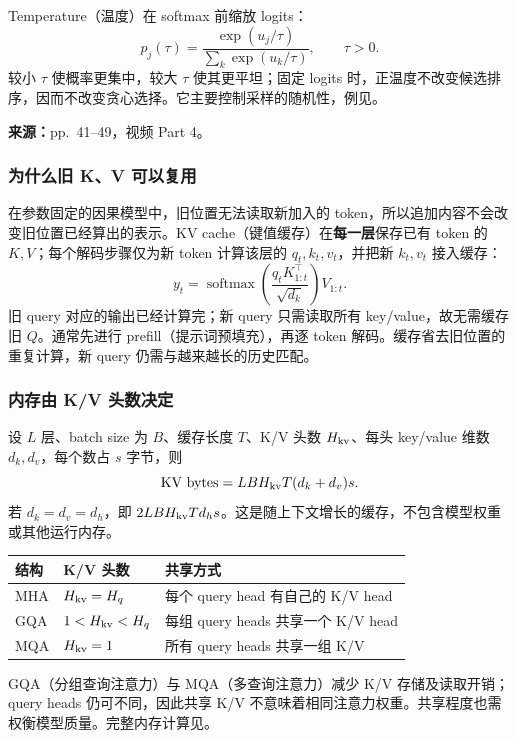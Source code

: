 Temperature（温度）在 softmax 前缩放 logits：
\[
 p_j(\tau)=\frac{\exp(u_j/\tau)}{\sum_k\exp(u_k/\tau)},\qquad \tau>0.
\]
较小 $\tau$ 使概率更集中，较大 $\tau$ 使其更平坦；固定 logits 时，正温度不改变候选排序，因而不改变贪心选择。它主要控制采样的随机性，例见。


\textbf{来源：}pp.~41--49，视频 Part 4。

\subsubsection{为什么旧 K、V 可以复用}

在参数固定的因果模型中，旧位置无法读取新加入的 token，所以追加内容不会改变旧位置已经算出的表示。KV cache（键值缓存）在\textbf{每一层}保存已有 token 的 $K,V$；每个解码步骤仅为新 token 计算该层的 $q_t,k_t,v_t$，并把新 $k_t,v_t$ 接入缓存：
\[
 y_t=\operatorname{softmax}\!\left(\frac{q_tK_{1:t}^\top}{\sqrt{d_k}}\right)V_{1:t}.
\]
旧 query 对应的输出已经计算完；新 query 只需读取所有 key/value，故无需缓存旧 $Q$。通常先进行 prefill（提示词预填充），再逐 token 解码。缓存省去旧位置的重复计算，新 query 仍需与越来越长的历史匹配。

\subsubsection{内存由 K/V 头数决定}

设 $L$ 层、batch size 为 $B$、缓存长度 $T$、K/V 头数 $H_{\rm kv}$、每头 key/value 维数 $d_k,d_v$，每个数占 $s$ 字节，则
\[
 \text{KV bytes}=LBH_{\rm kv}T(d_k+d_v)s.
\]
若 $d_k=d_v=d_h$，即 $2LBH_{\rm kv}Td_hs$。这是随上下文增长的缓存，不包含模型权重或其他运行内存。

\begin{center}
\small
\begin{tabularx}{\textwidth}{@{}llX@{}}
\toprule
结构 & K/V 头数 & 共享方式 \\
\midrule
MHA & $H_{\rm kv}=H_q$ & 每个 query head 有自己的 K/V head \\
GQA & $1<H_{\rm kv}<H_q$ & 每组 query heads 共享一个 K/V head \\
MQA & $H_{\rm kv}=1$ & 所有 query heads 共享一组 K/V \\
\bottomrule
\end{tabularx}
\end{center}
GQA（分组查询注意力）与 MQA（多查询注意力）减少 K/V 存储及读取开销；query heads 仍可不同，因此共享 K/V 不意味着相同注意力权重。共享程度也需权衡模型质量。完整内存计算见。

